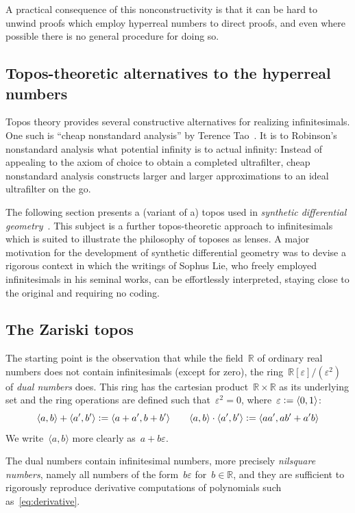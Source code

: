 \documentclass[oneside,reqno]{amsart}
\theoremstyle{definition}
\theoremstyle{plain}
\theoremstyle{remark}
\newcommand{\RR}{\mathbb{R}}
\newcommand{\defeq}{\vcentcolon=}
\renewcommand{\_}{\mathpunct{.}\,}
\newcommand{\?}{\,{:}\,}
\begin{document}
A practical consequence of this nonconstructivity is that it can be hard to
unwind proofs which employ hyperreal numbers to direct proofs, and even where
possible there is no general procedure for doing so.


\subsection{Topos-theoretic alternatives to the hyperreal numbers} Topos theory
provides several constructive alternatives for realizing infinitesimals.
One such is ``cheap nonstandard analysis'' by Terence Tao~\cite{tao:cheap-nsa}.
It is to Robinson's nonstandard analysis what potential infinity is
to actual infinity: Instead of appealing to the axiom of choice to
obtain a completed ultrafilter, cheap nonstandard analysis constructs larger
and larger approximations to an ideal ultrafilter on the go.

The following section presents a (variant of a) topos used in \emph{synthetic differential
geometry}~\cite{kock:sdg,kock:new-methods}. This subject is a further topos-theoretic
approach to infinitesimals which is suited to illustrate the philosophy of toposes
as lenses. A major motivation for the development of synthetic differential
geometry was to devise a rigorous context in which the
writings of Sophus Lie, who freely employed infinitesimals in his seminal
works, can be effortlessly interpreted, staying close to the
original and requiring no coding.


\subsection{The Zariski topos} The starting point is the observation that
while the field~$\RR$ of ordinary real numbers does not contain infinitesimals
(except for zero), the ring~$\RR[\varepsilon]/(\varepsilon^2)$ of \emph{dual
numbers} does. This ring has the cartesian product~$\RR \times \RR$ as its
underlying set and the ring operations are defined such
that~$\varepsilon^2 = 0$, where~$\varepsilon \defeq \langle 0,1 \rangle$:
\[
  \langle a,b \rangle + \langle a',b' \rangle \defeq
  \langle a+a', b+b' \rangle \qquad
  \langle a,b \rangle \cdot \langle a',b' \rangle \defeq
  \langle aa', ab'+a'b \rangle
\]
We write~$\langle a,b \rangle$ more clearly
as~$a+b\varepsilon$.

The dual numbers contain infinitesimal numbers, more precisely \emph{nilsquare
numbers}, namely all numbers of the form~$b \varepsilon$ for~$b \in \RR$, and
they are sufficient to rigorously reproduce derivative computations of
polynomials such as~\eqref{eq:derivative}.
\end{document}
